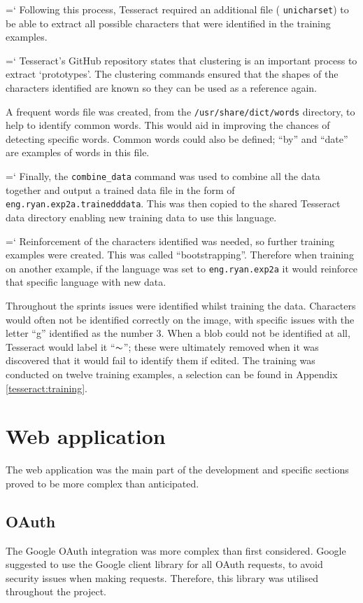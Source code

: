 {{{{{\ttfamily \hyphenchar\the\font=`\-}%
Following this process, Tesseract required an additional file ( \texttt{unicharset}) to be able to extract all possible characters that were identified in the training examples.

{{\ttfamily \hyphenchar\the\font=`\-}%
Tesseract's GitHub repository states that clustering is an important process to extract `prototypes'. The clustering commands ensured that the shapes of the characters identified are known so they can be used as a reference again.

A frequent words file was created, from the \texttt{/usr/share/dict/words} directory, to help to identify common words. This would aid in improving the chances of detecting specific words. Common words could also be defined; ``by'' and ``date'' are examples of words in this file.

{{\ttfamily \hyphenchar\the\font=`\-}%
Finally, the \texttt{combine\_data} command was used to combine all the data together and output a trained data file in the form of \texttt{eng.ryan.exp2a.trainedddata}. This was then copied to the shared Tesseract data directory enabling new training data to use this language.

{{\ttfamily \hyphenchar\the\font=`\-}%
Reinforcement of the characters identified was needed, so further training examples were created. This was called ``bootstrapping''. Therefore when training on another example, if the language was set to \texttt{eng.ryan.exp2a} it would reinforce that specific language with new data.

Throughout the sprints issues were identified whilst training the data. Characters would often not be identified correctly on the image, with specific issues with the letter ``g''  identified as the number 3. When a blob could not be identified at all, Tesseract would label it ``$\thicksim $''; these were ultimately removed when it was discovered that it would fail to identify them if edited. The training was conducted on twelve training examples, a selection can be found in Appendix \ref{tesseract:training}.

\section{Web application}
The web application was the main part of the development and specific sections proved to be more complex than anticipated.

\subsection{OAuth}\label{app:oauth}
The Google OAuth integration was more complex than first considered. Google suggested to use the Google client library \cite{citeulike:14024993} for all OAuth requests, to avoid security issues when making requests. Therefore, this library was utilised throughout the project.

}}}}}}}
